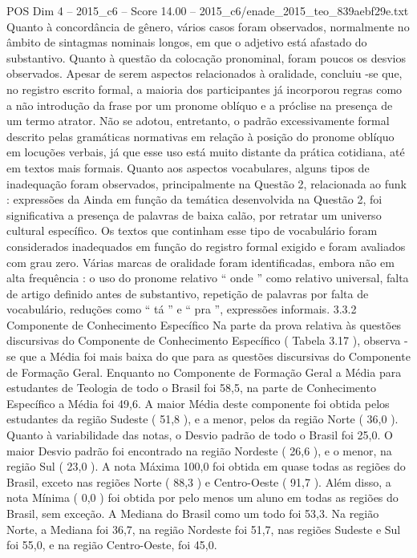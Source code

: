 \begin{textsample}{POS Dim 4 – 2015\_c6 – Score 14.00 – 2015\_c6/enade\_2015\_teo\_839aebf29e.txt}
Quanto à concordância de gênero, vários casos foram observados, normalmente no âmbito de sintagmas nominais longos, em que o adjetivo está afastado do substantivo.
Quanto à questão da colocação pronominal, foram poucos os desvios observados.
Apesar de serem aspectos relacionados à oralidade, concluiu -se que, no registro escrito formal, a maioria dos participantes já incorporou regras como a não introdução da frase por um pronome oblíquo e a próclise na presença de um termo atrator.
Não se adotou, entretanto, o padrão excessivamente formal descrito pelas gramáticas normativas em relação à posição do pronome oblíquo em locuções verbais, já que esse uso está muito distante da prática cotidiana, até em textos mais formais.
Quanto aos aspectos vocabulares, alguns tipos de inadequação foram observados, principalmente na Questão 2, relacionada ao funk : expressões da Ainda em função da temática desenvolvida na Questão 2, foi significativa a presença de palavras de baixa calão, por retratar um universo cultural específico.
Os textos que continham esse tipo de vocabulário foram considerados inadequados em função do registro formal exigido e foram avaliados com grau zero.
Várias marcas de oralidade foram identificadas, embora não em alta frequência : o uso do pronome relativo “ onde ” como relativo universal, falta de artigo definido antes de substantivo, repetição de palavras por falta de vocabulário, reduções como “ tá ” e “ pra ”, expressões informais. 3.3.2 Componente de Conhecimento Específico Na parte da prova relativa às questões discursivas do Componente de Conhecimento Específico ( Tabela 3.17 ), observa -se que a Média foi mais baixa do que para as questões discursivas do Componente de Formação Geral.
Enquanto no Componente de Formação Geral a Média para estudantes de Teologia de todo o Brasil foi 58,5, na parte de Conhecimento Específico a Média foi 49,6.
A maior Média deste componente foi obtida pelos estudantes da região Sudeste ( 51,8 ), e a menor, pelos da região Norte ( 36,0 ).
Quanto à variabilidade das notas, o Desvio padrão de todo o Brasil foi 25,0.
O maior Desvio padrão foi encontrado na região Nordeste ( 26,6 ), e o menor, na região Sul ( 23,0 ).
A nota Máxima 100,0 foi obtida em quase todas as regiões do Brasil, exceto nas regiões Norte ( 88,3 ) e Centro-Oeste ( 91,7 ).
Além disso, a nota Mínima ( 0,0 ) foi obtida por pelo menos um aluno em todas as regiões do Brasil, sem exceção.
A Mediana do Brasil como um todo foi 53,3.
Na região Norte, a Mediana foi 36,7, na região Nordeste foi 51,7, nas regiões Sudeste e Sul foi 55,0, e na região Centro-Oeste, foi 45,0.

\end{textsample}
